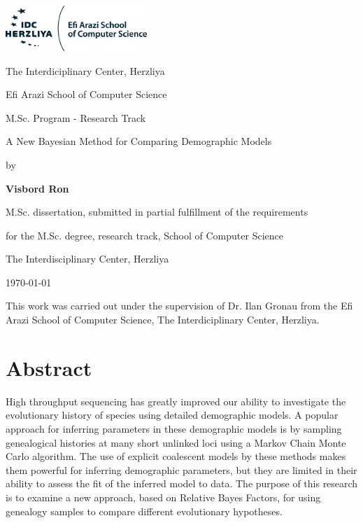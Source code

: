 \documentclass[11pt]{article}
\author{Ron Visbord}
\newcommand{\1}{\mathbbm{1}}
\begin{document}
\begin{titlepage}
	\centering
	\includegraphics[width=0.4\textwidth]{IDC_logo}\par\vspace{2cm}
	{\huge The Interdiciplinary Center, Herzliya \par}
	{\Large Efi Arazi School of Computer Science \par}
	{\Large M.Sc. Program - Research Track \par}
	
	\vspace{1cm}
	
	\vspace{1.5cm}
	{\Huge A New Bayesian Method for Comparing Demographic Models \par}
	\vspace{3cm}
	{\large by\par}
	{\large\bfseries Visbord Ron\par}
	
	\vspace{2cm}
	{M.Sc. dissertation, submitted in partial fulfillment of the requirements\par}
	{for the M.Sc. degree, research track, School of Computer Science\par}
	{The Interdisciplinary Center, Herzliya}
	
	\vfill
	
	{\large \monthyeardate\today \par}
	
\end{titlepage}

\newpage

This work was carried out under the supervision of Dr. Ilan Gronau from the Efi Arazi School of Computer Science, The Interdiciplinary Center, Herzliya.

\newpage

\section*{Abstract}
High throughput sequencing has greatly improved our ability to investigate the evolutionary history of species using detailed demographic models. A popular approach for inferring parameters in these demographic models is by sampling genealogical histories at many short unlinked loci using a Markov Chain Monte Carlo algorithm. The use of explicit coalescent models by these methods makes them powerful for inferring demographic parameters, but they are limited in their ability to assess the fit of the inferred model to data. The purpose of this research is to examine a new approach, based on Relative Bayes Factors, for using genealogy samples to compare different evolutionary hypotheses. 
\end{document}
